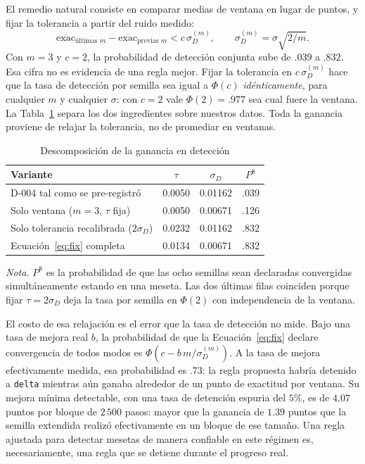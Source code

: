 \documentclass[jou,11pt,donotrepeattitle]{apa7}
\begin{document}
El remedio natural consiste en comparar medias de ventana en lugar de puntos, y fijar la
tolerancia a partir del ruido medido:
%
\begin{equation}
\overline{\mathrm{exac}}_{\text{\'ultimas } m} - \overline{\mathrm{exac}}_{\text{previas } m}
< c\,\sigma_D^{(m)}, \qquad \sigma_D^{(m)} = \sigma\sqrt{2/m} .
\label{eq:fix}
\end{equation}
%
Con $m = 3$ y $c = 2$, la probabilidad de detecci\'on conjunta sube de $.039$ a $.832$. Esa cifra
no es evidencia de una regla mejor. Fijar la tolerancia en $c\,\sigma_D^{(m)}$ hace que la tasa de
detecci\'on por semilla sea igual a $\Phi(c)$ \emph{id\'enticamente}, para cualquier $m$ y
cualquier $\sigma$: con $c = 2$ vale $\Phi(2) = .977$ sea cual fuere la ventana. La
Tabla~\ref{tab:desc} separa los dos ingredientes sobre nuestros datos. Toda la ganancia proviene
de relajar la tolerancia, no de promediar en ventanas.

\begin{table}[htbp]
\caption{Descomposici\'on de la ganancia en detecci\'on}
\label{tab:desc}
\begin{tabular}{lccc}
\toprule
Variante & $\tau$ & $\sigma_D$ & $P^{8}$ \\
\midrule
D-004 tal como se pre-registr\'o          & 0.0050 & 0.01162 & .039 \\
Solo ventana ($m = 3$, $\tau$ fija)       & 0.0050 & 0.00671 & .126 \\
Solo tolerancia recalibrada ($2\sigma_D$) & 0.0232 & 0.01162 & .832 \\
Ecuaci\'on~\ref{eq:fix} completa          & 0.0134 & 0.00671 & .832 \\
\bottomrule
\end{tabular}

\vspace{5pt}
{\small\raggedright \textit{Nota.} $P^{8}$ es la probabilidad de que las ocho semillas sean
declaradas convergidas simult\'aneamente estando en una meseta. Las dos \'ultimas filas coinciden
porque fijar $\tau = 2\sigma_D$ deja la tasa por semilla en $\Phi(2)$ con independencia de la
ventana.
\par}
\end{table}

El costo de esa relajaci\'on es el error que la tasa de detecci\'on no mide. Bajo una tasa de
mejora real $b$, la probabilidad de que la Ecuaci\'on~\ref{eq:fix} declare convergencia de todos
modos es $\Phi\!\left(c - b\,m/\sigma_D^{(m)}\right)$. A la tasa de mejora efectivamente medida,
esa probabilidad es $.73$: la regla propuesta habr\'ia detenido a \texttt{delta} mientras a\'un
ganaba alrededor de un punto de exactitud por ventana. Su mejora m\'inima detectable, con una
tasa de detenci\'on espuria del $5\%$, es de $4.07$ puntos por bloque de $2\,500$ pasos: mayor
que la ganancia de $1.39$ puntos que la semilla extendida realiz\'o efectivamente en un bloque de
ese tama\~no. Una regla ajustada para detectar mesetas de manera confiable en este r\'egimen es,
necesariamente, una regla que se detiene durante el progreso real.
\end{document}
